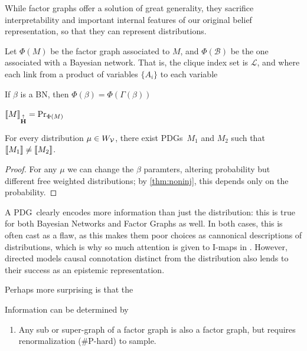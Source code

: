 \documentclass{article}
\newcommand\changeon{\color{note-fg} }
\newcommand\MaxEnt{{\overset{\uparrow}{\mathbf H}}}
\newcommand\bmu{\boldsymbol{\mu}}
\newcommand{\MN}{PDG}
\newcommand{\MNs}{\MN s}
\begin{document}
	
	While factor graphs offer a solution of great generality, they sacrifice interpretability and important internal features of our original belief representation, so that they can represent distributions.
	
	
	
	\changeon
	Let $\Phi(M)$ be the factor graph associated to $M$, and $\Phi(\mathcal B)$ be the one associated with a Bayesian network. That is, the clique index set is $\mathcal L$, and where each link from a product of variables $\{A_i\}$ to 
	each variable 
	

	\begin{prop}
		If $\beta$ is a BN, then $\Phi(\beta)  = \Phi(\Gamma(\beta))$
	\end{prop}


	\begin{conj}
		$\bbr{M}_\MaxEnt = \Pr_{\Phi(M)}$
	\end{conj}
	\begin{coro}\label{thm:noninj}
		For every distribution $\mu \in W_{\cal V}$, there exist \MNs\ $M_1$ and $M_2$ such that $\llbracket M_1\rrbracket \neq \llbracket M_2\rrbracket$. 
	\end{coro}
	\begin{proof}
		For any $\mu$ we can change the $\beta$ paramters, altering probability but different free weighted distributions; by \cref{thm:noninj}, this depends only on the probability.
	\end{proof}
	
	A \MN\ clearly encodes more information than just the distribution: this is true for both Bayesian Networks and Factor Graphs as well. In both cases, this is often cast as a flaw, as this makes them poor choices as cannonical descriptions of distributions, which is why so much attention is given to I-maps in \cite{graphical models}. However, directed models causal connotation distinct from the distribution also lends to their success as an epistemic representation.
	
	Perhaps more surprising is that the 
	
	\begin{conj}
		Information can be determined by 
	\end{conj}

	\begin{fact}
		\begin{enumerate}
			\item Any sub or super-graph of a factor graph is also a factor graph, but requires renormalization (\#P-hard) to sample.
		\end{enumerate}
	\end{fact}
\end{document}
